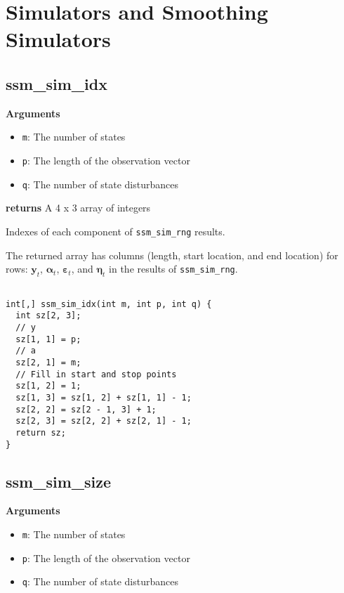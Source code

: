 \documentclass[]{book}
\providecommand{\tightlist}{%
  \setlength{\itemsep}{0pt}\setlength{\parskip}{0pt}}
\renewcommand{\vec}[1]{\boldsymbol{#1}}
\begin{document}
\section{Simulators and Smoothing
Simulators}\label{simulators-and-smoothing-simulators}

\subsection{ssm\_sim\_idx}\label{ssm_sim_idx}

\textbf{Arguments}

\begin{itemize}
\tightlist
\item
  \texttt{m}: The number of states
\item
  \texttt{p}: The length of the observation vector
\item
  \texttt{q}: The number of state disturbances
\end{itemize}

\textbf{returns} A 4 x 3 array of integers

Indexes of each component of \texttt{ssm\_sim\_rng} results.

The returned array has columns (length, start location, and end
location) for rows: \(\vec{y}_t\), \(\vec{\alpha}_t\),
\(\vec{\varepsilon}_t\), and \(\vec{\eta}_t\) in the results of
\texttt{ssm\_sim\_rng}.

\begin{verbatim}

int[,] ssm_sim_idx(int m, int p, int q) {
  int sz[2, 3];
  // y
  sz[1, 1] = p;
  // a
  sz[2, 1] = m;
  // Fill in start and stop points
  sz[1, 2] = 1;
  sz[1, 3] = sz[1, 2] + sz[1, 1] - 1;
  sz[2, 2] = sz[2 - 1, 3] + 1;
  sz[2, 3] = sz[2, 2] + sz[2, 1] - 1;
  return sz;
}

\end{verbatim}

\subsection{ssm\_sim\_size}\label{ssm_sim_size}

\textbf{Arguments}

\begin{itemize}
\tightlist
\item
  \texttt{m}: The number of states
\item
  \texttt{p}: The length of the observation vector
\item
  \texttt{q}: The number of state disturbances
\end{itemize}
\end{document}
